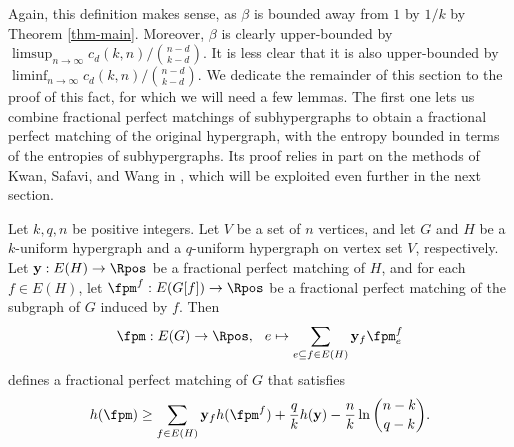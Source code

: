\documentclass[11pt]{article}
\newcommand{\fpmy}{\mathbf{y}}
\begin{document}
Again, this definition makes sense, as $\beta$ is bounded away from $1$ by $1/k$ by Theorem \ref{thm-main}. Moreover, $\beta$ is clearly upper-bounded by $\limsup_{n\to\infty} c_d(k,n)/\binom{n-d}{k-d}$. It is less clear that it is also upper-bounded by $\liminf_{n\to\infty} c_d(k,n)/\binom{n-d}{k-d}$. We dedicate the remainder of this section to the proof of this fact, for which we will need a few lemmas. The first one lets us combine fractional perfect matchings of subhypergraphs to obtain a fractional perfect matching of the original hypergraph, with the entropy bounded in terms of the entropies of subhypergraphs. Its proof relies in part on the methods of Kwan, Safavi, and Wang in \cite{kwan2026counting}, which will be exploited even further in the next section.

\begin{lemma}\label{le-ent-comb}
    Let $k,q,n$ be positive integers. Let $V$ be a set of $n$ vertices, and let $G$ and $H$ be a $k$-uniform hypergraph and a $q$-uniform hypergraph on vertex set $V$, respectively. Let $\fpmy:E(H)\to\Rpos$ be a fractional perfect matching of $H$, and for each $f\in E(H)$, let $\fpm^f:E(G[f])\to\Rpos$ be a fractional perfect matching of the subgraph of $G$ induced by $f$. Then
    \begin{equation*}
        \fpm:E(G)\to\Rpos, \hspace{7pt} e\mapsto\sum_{e\subseteq f\in E(H)}\fpmy_f \fpm^f_e
    \end{equation*}
    defines a fractional perfect matching of $G$ that satisfies
    \begin{equation*}
        h(\fpm)\ge \sum_{f\in E(H)}\fpmy_f h(\fpm^f) + \frac{q }{k }h(\fpmy) - \frac{n }{k }\ln \binom{n-k}{q-k}.
    \end{equation*}
\end{lemma}
\end{document}
